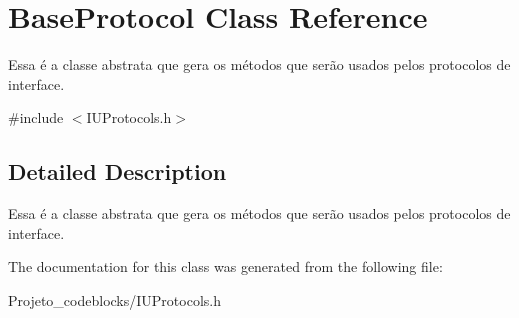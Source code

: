 \hypertarget{class_base_protocol}{\section{Base\-Protocol Class Reference}
\label{class_base_protocol}
}


Essa é a classe abstrata que gera os métodos que serão usados pelos protocolos de interface.  




{\ttfamily \#include $<$I\-U\-Protocols.\-h$>$}



\subsection{Detailed Description}
Essa é a classe abstrata que gera os métodos que serão usados pelos protocolos de interface. 

The documentation for this class was generated from the following file\-:\begin{DoxyCompactItemize}
\item 
Projeto\-\_\-codeblocks/I\-U\-Protocols.\-h\end{DoxyCompactItemize}
